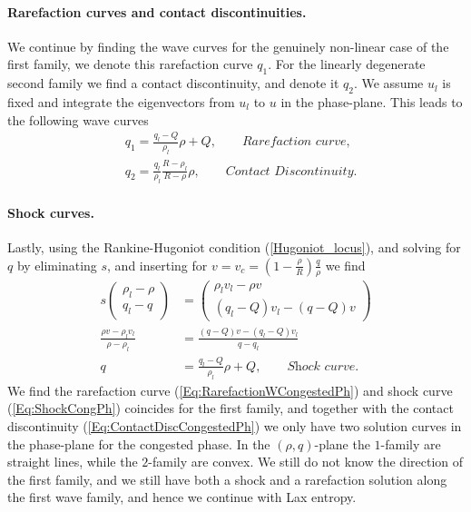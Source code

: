 \documentclass[10pt]{article}
\numberwithin{equation}{section}
\begin{document}
\paragraph{Rarefaction curves and contact discontinuities.}
We continue by finding the wave curves for the genuinely non-linear case of the first family, we denote this rarefaction curve $q_1$. For the linearly degenerate second family we find a contact discontinuity, and denote it $q_2$. We assume $u_l$ is fixed and integrate the eigenvectors from $u_l$ to $u$ in the phase-plane. This leads to the following wave curves
\begin{align}
    & q_1 = \frac{q_l - Q}{\rho_l} \rho + Q, \quad \quad \textit{Rarefaction curve,}
    \label{Eq:RarefactionWCongestedPh} \\
    &  q_2 = \frac{q_l}{\rho_l} \frac{R - \rho_l}{R- \rho} \rho,   \quad \quad \textit{Contact Discontinuity.}
    \label{Eq:ContactDiscCongestedPh}
\end{align}

\paragraph{Shock curves.}
Lastly, using the Rankine-Hugoniot condition (\ref{Hugoniot_locus}), and solving for $q$ by eliminating $s$, and inserting for $v = v_c = (1- \frac{\rho}{R})\frac{q}{\rho}$ we find
\begin{align}
     s \begin{pmatrix} \rho_l - \rho \\ q_l - q \end{pmatrix} &= \begin{pmatrix} \rho_l v_l - \rho v \\ (q_l - Q)v_l - (q - Q)v \end{pmatrix} \nonumber\\
     \frac{\rho v - \rho_l v_l}{\rho - \rho_l} &= \frac{(q-Q)v - (q_l-Q)v_l}{q - q_l} \nonumber\\
      q &= \frac{q_l - Q}{\rho_l} \rho + Q,  \quad \quad \textit{Shock curve.}
     \label{Eq:ShockCongPh}
\end{align}
We find the rarefaction curve (\ref{Eq:RarefactionWCongestedPh}) and shock curve (\ref{Eq:ShockCongPh}) coincides for the first family, and together with the contact discontinuity (\ref{Eq:ContactDiscCongestedPh}) we only have two solution curves in the phase-plane for the congested phase. In the $(\rho,q)$-plane the $1$-family are straight lines, while the $2$-family are convex.
We still do not know the direction of the first family, and we still have both a shock and a rarefaction solution along the first wave family, and hence we continue with Lax entropy. 
\end{document}
